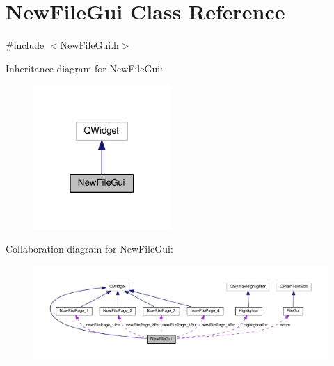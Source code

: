 \hypertarget{class_new_file_gui}{\section{New\-File\-Gui Class Reference}
\label{class_new_file_gui}
}


{\ttfamily \#include $<$New\-File\-Gui.\-h$>$}



Inheritance diagram for New\-File\-Gui\-:\nopagebreak
\begin{figure}[H]
\begin{center}
\leavevmode
\includegraphics[width=148pt]{class_new_file_gui__inherit__graph}
\end{center}
\end{figure}


Collaboration diagram for New\-File\-Gui\-:\nopagebreak
\begin{figure}[H]
\begin{center}
\leavevmode
\includegraphics[width=350pt]{class_new_file_gui__coll__graph}
\end{center}
\end{figure}
